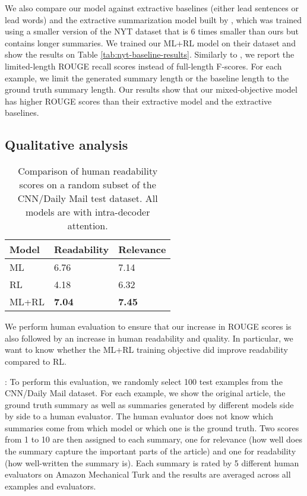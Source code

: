 \documentclass{article} \usepackage{iclr2018_arxiv,times}
\begin{document}
We also compare our model against extractive baselines (either lead sentences or lead words) and the extractive summarization model built by \citet{durrett2016learning}, which was trained using a smaller version of the NYT dataset that is 6 times smaller than ours but contains longer summaries. We trained our ML+RL model on their dataset and show the results on Table \ref{tab:nyt-baseline-results}. Similarly to \citet{durrett2016learning}, we report the limited-length ROUGE recall scores instead of full-length F-scores. For each example, we limit the generated summary length or the baseline length to the ground truth summary length. Our results show that our mixed-objective model has higher ROUGE scores than their extractive model and the extractive baselines.

\subsection{Qualitative analysis}
\label{ssec:qual-analysis}

\begin{table}
\centering
\begin{tabular}{|l|l|l|}
\hline
{\bf Model} & {\bf Readability} & {\bf Relevance}\\\hline
ML & 6.76 & 7.14 \\
RL & 4.18 & 6.32 \\
ML+RL & \bf 7.04 & \bf 7.45 \\\hline
\end{tabular}
\caption{Comparison of human readability scores on a random subset of the CNN/Daily Mail test dataset. All models are with intra-decoder attention.}
\label{tab:human-results}
\end{table}

We perform human evaluation to ensure that our increase in ROUGE scores is also followed by an increase in human readability and quality. In particular, we want to know whether the ML+RL training objective did improve readability compared to RL.

: To perform this evaluation, we randomly select 100 test examples from the CNN/Daily Mail dataset. For each example, we show the original article, the ground truth summary as well as summaries generated by different models side by side to a human evaluator. The human evaluator does not know which summaries come from which model or which one is the ground truth. Two scores from 1 to 10 are then assigned to each summary, one for relevance (how well does the summary capture the important parts of the article) and one for readability (how well-written the summary is). Each summary is rated by 5 different human evaluators on Amazon Mechanical Turk and the results are averaged across all examples and evaluators.
\end{document}
